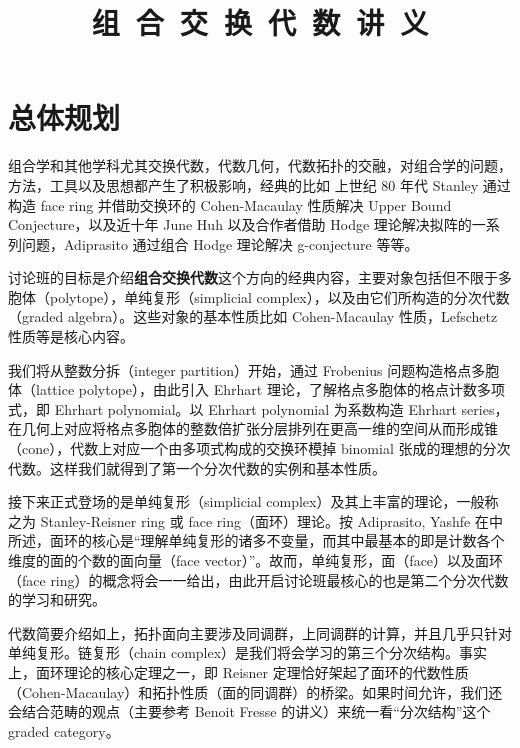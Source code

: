 \documentclass[12pt,a4paper]{ctexbook} %
\title{{\kaishu\fontsize{48}{60}\selectfont 组~合~交~换~代~数~讲~义}} %
\numberwithin{figure}{section}
\theoremstyle{problemstyle}
\numberwithin{equation}{section} %
\begin{document}
\maketitle




\section*{总体规划}
组合学和其他学科尤其交换代数，代数几何，代数拓扑的交融，对组合学的问题，方法，工具以及思想都产生了积极影响，经典的比如 上世纪 80 年代 Stanley 通过构造 face ring 并借助交换环的 Cohen-Macaulay 性质解决 Upper Bound Conjecture，以及近十年 June Huh 以及合作者借助 Hodge 理论解决拟阵的一系列问题，Adiprasito 通过组合 Hodge 理论解决 g-conjecture 等等。

讨论班的目标是介绍\textbf{组合交换代数}这个方向的经典内容，主要对象包括但不限于多胞体（polytope），单纯复形（simplicial complex），以及由它们所构造的分次代数（graded algebra）。这些对象的基本性质比如 Cohen-Macaulay 性质，Lefschetz 性质等是核心内容。

我们将从整数分拆（integer partition）开始，通过 Frobenius 问题构造格点多胞体（lattice polytope），由此引入 Ehrhart 理论，了解格点多胞体的格点计数多项式，即 Ehrhart polynomial。以 Ehrhart polynomial 为系数构造 Ehrhart series，在几何上对应将格点多胞体的整数倍扩张分层排列在更高一维的空间从而形成锥（cone），代数上对应一个由多项式构成的交换环模掉 binomial 张成的理想的分次代数。这样我们就得到了第一个分次代数的实例和基本性质。

接下来正式登场的是单纯复形（simplicial complex）及其上丰富的理论，一般称之为 Stanley-Reisner ring 或 face ring（面环）理论。按 Adiprasito, Yashfe 在\cite{AY21}中所述，面环的核心是“理解单纯复形的诸多不变量，而其中最基本的即是计数各个维度的面的个数的面向量（face vector）”。故而，单纯复形，面（face）以及面环（face ring）的概念将会一一给出，由此开启讨论班最核心的也是第二个分次代数的学习和研究。

代数简要介绍如上，拓扑面向主要涉及同调群，上同调群的计算，并且几乎只针对单纯复形。链复形（chain complex）是我们将会学习的第三个分次结构。事实上，面环理论的核心定理之一，即 Reisner 定理恰好架起了面环的代数性质（Cohen-Macaulay）和拓扑性质（面的同调群）的桥梁。如果时间允许，我们还会结合范畴的观点（主要参考 Benoit Fresse 的讲义）来统一看“分次结构”这个 graded category。
\end{document}
